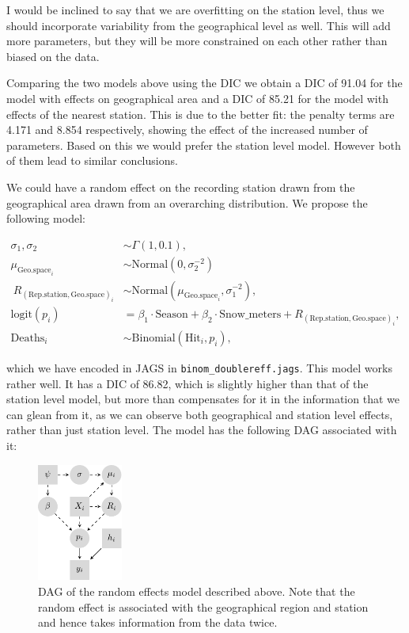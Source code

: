 \documentclass[10pt]{extarticle}
\begin{document}
I would be inclined to say that we are overfitting on the station level, thus we should incorporate variability from the geographical level as well. This will add more parameters, but they will be more constrained on each other rather than biased on the data.

Comparing the two models above using the DIC we obtain a DIC of 91.04 for the model with effects on geographical area and a DIC of 85.21 for the model with effects of the nearest station. This is due to the better fit: the penalty terms are 4.171 and 8.854 respectively, showing the effect of the increased number of parameters. Based on this we would prefer the station level model. However both of them lead to similar conclusions.

We could have a random effect on the recording station drawn from the geographical area drawn from an overarching distribution. We propose the following model:

\begin{align*}
\sigma_1, \sigma_2 &\sim \Gamma(1, 0.1), \\
\mu_{\mathrm{Geo.space}_i} &\sim \mathrm{Normal}(0, \sigma_2^{-2})\\\
R_{\mathrm{(Rep.station, Geo.space)}_i} &\sim \mathrm{Normal}(\mu_{\mathrm{Geo.space}_i}, \sigma_1^{-2}),\\
\mathrm{logit}(p_i) &= \beta_1 \cdot \mathrm{Season} + \beta_2 \cdot \mathrm{Snow\_meters} + R_{\mathrm{(Rep.station, Geo.space)}_i}, \\
\mathrm{Deaths}_i &\sim \mathrm{Binomial}(\mathrm{Hit}_i, p_i),
\end{align*}

which we have encoded in JAGS in \texttt{binom\_doublereff.jags}. This model works rather well. It has a DIC of 86.82, which is slightly higher than that of the station level model, but more than compensates for it in the information that we can glean from it, as we can observe both geographical and station level effects, rather than just station level. The model has the following DAG associated with it:

\begin{figure}[H]
	\centering
	\includegraphics[width = 0.25\textwidth]{DAG-figure1}
	\caption{DAG of the random effects model described above. Note that the random effect is associated with the geographical region and station and hence takes information from the data twice.}
	\label{fig:dag1}
\end{figure}
\printbibliography
\end{document}
